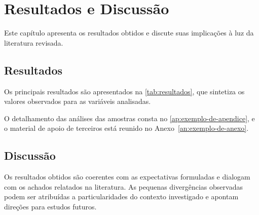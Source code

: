 \chapter{Resultados e Discussão}
\label{cap:resultados-e-discussao}


Este capítulo apresenta os resultados obtidos e discute suas implicações à luz da literatura revisada.

\section{Resultados}
\label{sec:resultados}

Os principais resultados são apresentados na \autoref{tab:resultados}, que sintetiza os valores observados para as variáveis analisadas.

\begin{table}[!htbp]
    \centering
\end{table}

O detalhamento das análises das amostras consta no \autoref{ap:exemplo-de-apendice}, e o material de apoio de terceiros está reunido no Anexo~\ref{an:exemplo-de-anexo}.

\section{Discussão}
\label{sec:discussao}

Os resultados obtidos são coerentes com as expectativas formuladas e dialogam com os achados relatados na literatura. As pequenas divergências observadas podem ser atribuídas a particularidades do contexto investigado e apontam direções para estudos futuros.
